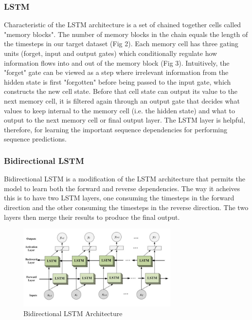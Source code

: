 \documentclass[journal]{IEEEtran}
\begin{document}
    \subsubsection{LSTM}
    Characteristic of the LSTM architecture is a set of chained together cells called "memory blocks". The number
    of memory blocks in the chain equals the length of the timesteps in our target dataset (Fig 2).
    Each memory cell has three gating units (forget, input and output gates) which
    conditionally regulate how information flows into and out of the memory block (Fig 3). Intuitively,
    the "forget" gate can be viewed as a step where irrelevant information from the hidden state
    is first "forgotten" before being passed to the input gate, which constructs the new cell state.
    Before that cell state can output its value to the next memory cell, it is filtered again through
    an output gate that decides what values to keep internal to the memory cell (i.e. the hidden state)
    and what to output to the next memory cell or final output layer.
    The LSTM layer is helpful, therefore, for learning the important sequence dependencies for performing
    sequence predictions.

    \subsubsection{Bidirectional LSTM}
        Bidirectional LSTM is a modification of the LSTM architecture that permits the model to learn both the
        forward and reverse dependencies. The way it acheives this is to have two LSTM layers, one consuming
        the timesteps in the forward direction and the other consuming the timesteps in the reverse direction.
        The two layers then merge their results to produce the final output.

    \begin{figure}[h]
      \centering
      \includegraphics[width=8cm]{bidirectional-lstm.jpeg}
      \caption{Bidirectional LSTM Architecture}
    \end{figure}
\end{document}
